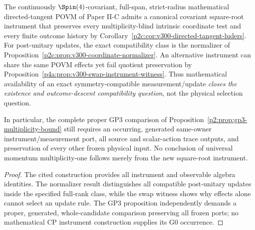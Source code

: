 \documentclass[11pt,a4paper]{article}
\begin{document}
\begin{corollary}
\label{p2f:cor:v300-instrument-existence-gp3-firewall}
The continuously $\Spin(4)$-covariant, full-span, strict-radius
mathematical directed-tangent POVM of Paper II-C admits a canonical
covariant square-root instrument that preserves every
multiplicity-blind intrinsic coordinate test and every finite
outcome history by
Corollary~\ref{p2c:cor:v300-directed-tangent-luders}.
For post-unitary updates, the exact compatibility class is the
normalizer of Proposition~\ref{p2c:prop:v300-coordinate-normalizer}.
An alternative instrument can share the same POVM effects yet fail
quotient preservation by
Proposition~\ref{p4a:prop:v300-swap-instrument-witness}.
Thus mathematical availability of an exact symmetry-compatible
measurement/update \emph{closes the existence and outcome-descent
compatibility question}, not the physical selection question.

In particular, the complete proper GP3 comparison of
Proposition~\ref{p2:prop:gp3-multiplicity-bound} still requires
an occurring, generated same-owner instrument/measurement port,
all source and scalar-action trace outputs, and preservation of every
other frozen physical input. No conclusion of universal momentum
multiplicity-one follows merely from the new square-root instrument.
\end{corollary}
\begin{proof}
The cited construction provides all instrument and observable algebra
identities. The normalizer result distinguishes all compatible
post-unitary updates inside the specified full-rank class, while the
swap witness shows why effects alone cannot select an update rule.
The GP3 proposition independently demands a proper, generated,
whole-candidate comparison preserving all frozen ports; no
mathematical CP instrument construction supplies its G0 occurrence.
\end{proof}
\end{document}
